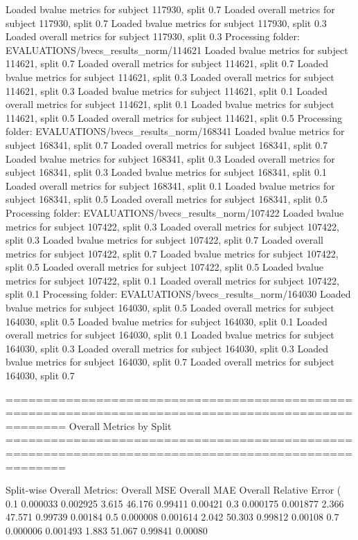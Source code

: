 Loaded bvalue metrics for subject 117930, split 0.7
Loaded overall metrics for subject 117930, split 0.7
Loaded bvalue metrics for subject 117930, split 0.3
Loaded overall metrics for subject 117930, split 0.3
Processing folder: EVALUATIONS/bvecs_results_norm/114621
Loaded bvalue metrics for subject 114621, split 0.7
Loaded overall metrics for subject 114621, split 0.7
Loaded bvalue metrics for subject 114621, split 0.3
Loaded overall metrics for subject 114621, split 0.3
Loaded bvalue metrics for subject 114621, split 0.1
Loaded overall metrics for subject 114621, split 0.1
Loaded bvalue metrics for subject 114621, split 0.5
Loaded overall metrics for subject 114621, split 0.5
Processing folder: EVALUATIONS/bvecs_results_norm/168341
Loaded bvalue metrics for subject 168341, split 0.7
Loaded overall metrics for subject 168341, split 0.7
Loaded bvalue metrics for subject 168341, split 0.3
Loaded overall metrics for subject 168341, split 0.3
Loaded bvalue metrics for subject 168341, split 0.1
Loaded overall metrics for subject 168341, split 0.1
Loaded bvalue metrics for subject 168341, split 0.5
Loaded overall metrics for subject 168341, split 0.5
Processing folder: EVALUATIONS/bvecs_results_norm/107422
Loaded bvalue metrics for subject 107422, split 0.3
Loaded overall metrics for subject 107422, split 0.3
Loaded bvalue metrics for subject 107422, split 0.7
Loaded overall metrics for subject 107422, split 0.7
Loaded bvalue metrics for subject 107422, split 0.5
Loaded overall metrics for subject 107422, split 0.5
Loaded bvalue metrics for subject 107422, split 0.1
Loaded overall metrics for subject 107422, split 0.1
Processing folder: EVALUATIONS/bvecs_results_norm/164030
Loaded bvalue metrics for subject 164030, split 0.5
Loaded overall metrics for subject 164030, split 0.5
Loaded bvalue metrics for subject 164030, split 0.1
Loaded overall metrics for subject 164030, split 0.1
Loaded bvalue metrics for subject 164030, split 0.3
Loaded overall metrics for subject 164030, split 0.3
Loaded bvalue metrics for subject 164030, split 0.7
Loaded overall metrics for subject 164030, split 0.7

====================================================================================================
Overall Metrics by Split
====================================================================================================

Split-wise Overall Metrics:
     Overall MSE  Overall MAE  Overall Relative Error (%
0.1     0.000033     0.002925                       3.615             46.176       0.99411        0.00421
0.3     0.000175     0.001877                       2.366             47.571       0.99739        0.00184
0.5     0.000008     0.001614                       2.042             50.303       0.99812        0.00108
0.7     0.000006     0.001493                       1.883             51.067       0.99841        0.00080

